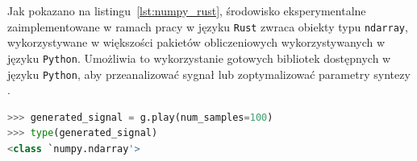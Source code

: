 Jak pokazano na listingu~\ref{lst:numpy_rust}, środowisko eksperymentalne zaimplementowane w ramach pracy w języku \texttt{Rust}
zwraca obiekty typu \texttt{ndarray}, wykorzystywane w większości pakietów obliczeniowych wykorzystywanych w języku \texttt{Python}.
Umożliwia to wykorzystanie gotowych bibliotek dostępnych w języku \texttt{Python},
aby przeanalizować sygnał lub zoptymalizować parametry syntezy \cite{2020SciPy-NMeth} \cite{librosa}.


\begin{lstlisting}[language=python, caption=Typ danych zwracanych przez środowisko eksperymentalne., label={lst:numpy_rust}]
>>> generated_signal = g.play(num_samples=100)
>>> type(generated_signal)
<class `numpy.ndarray'>
\end{lstlisting}



